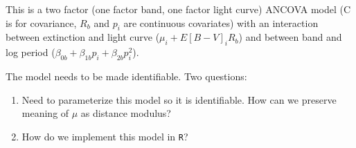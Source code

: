 \documentclass[12pt]{article}
\begin{document}
This is a two factor (one factor band, one factor light curve) ANCOVA model (C is for covariance, $R_b$ and $p_i$ are continuous covariates) with an interaction between extinction and light curve ($\mu_i + E[B-V]_iR_b$) and between band and log period ($\beta_{0b} + \beta_{1b}p_i + \beta_{2b}p_i^2$).

The model needs to be made identifiable. Two questions:
\begin{enumerate}
\item Need to parameterize this model so it is identifiable. How can we preserve meaning of $\mu$ as distance modulus?
\item How do we implement this model in \texttt{R}?
\end{enumerate}
\end{document}
